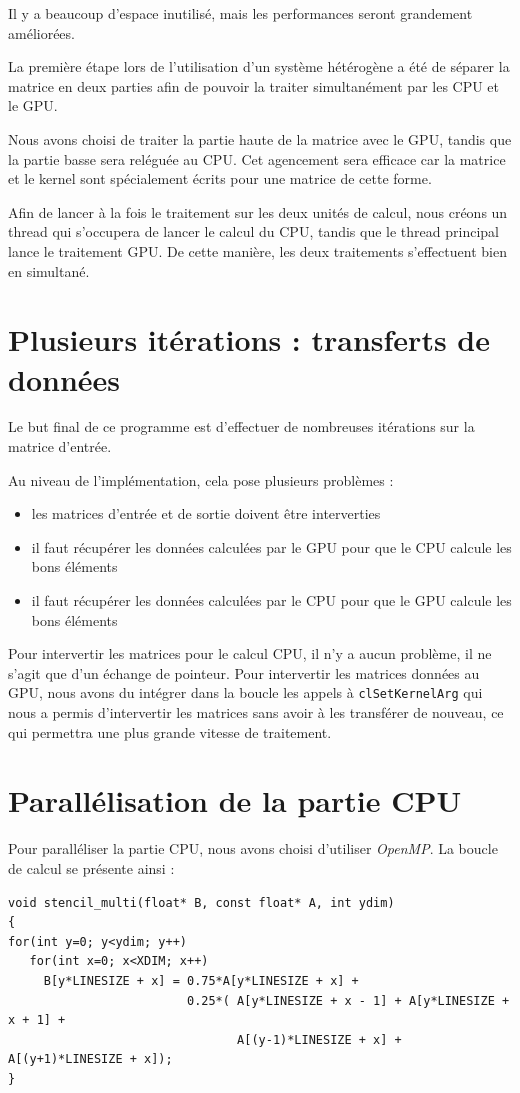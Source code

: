 \documentclass{article}
\begin{document}
Il y a beaucoup d'espace inutilisé, mais les performances seront
grandement améliorées.

La première étape lors de l'utilisation d'un système hétérogène a été
de séparer la matrice en deux parties afin de pouvoir la traiter
simultanément par les CPU et le GPU.

Nous avons choisi de traiter la partie haute de la matrice avec le
GPU, tandis que la partie basse sera reléguée au CPU. Cet agencement
sera efficace car la matrice et le kernel sont spécialement écrits
pour une matrice de cette forme.

Afin de lancer à la fois le traitement sur les deux unités de calcul,
nous créons un thread qui s'occupera de lancer le calcul du CPU,
tandis que le thread principal lance le traitement GPU.  De cette
manière, les deux traitements s'effectuent bien en simultané.

\section{Plusieurs itérations : transferts de données}

Le but final de ce programme est d'effectuer de nombreuses itérations
sur la matrice d'entrée.

Au niveau de l'implémentation, cela pose plusieurs problèmes :
\begin{itemize}
\item les matrices d'entrée et de sortie doivent être interverties
\item il faut récupérer les données calculées par le GPU pour que le CPU calcule les bons éléments
\item il faut récupérer les données calculées par le CPU pour que le GPU calcule les bons éléments
\end{itemize}

Pour intervertir les matrices pour le calcul CPU, il n'y a aucun
problème, il ne s'agit que d'un échange de pointeur.  Pour intervertir
les matrices données au GPU, nous avons du intégrer dans la boucle les
appels à \verb+clSetKernelArg+ qui nous a permis d'intervertir les
matrices sans avoir à les transférer de nouveau, ce qui permettra une
plus grande vitesse de traitement.


\section{Parallélisation de la partie CPU}

Pour paralléliser la partie CPU, nous avons choisi d'utiliser
\textit{OpenMP}.  La boucle de calcul se présente ainsi :
\begin{verbatim}
void stencil_multi(float* B, const float* A, int ydim)
{
for(int y=0; y<ydim; y++)
   for(int x=0; x<XDIM; x++)
     B[y*LINESIZE + x] = 0.75*A[y*LINESIZE + x] +
                         0.25*( A[y*LINESIZE + x - 1] + A[y*LINESIZE + x + 1] +
                                A[(y-1)*LINESIZE + x] + A[(y+1)*LINESIZE + x]);
}
\end{verbatim}
\end{document}
